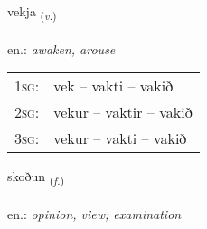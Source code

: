 \documentclass[frontgrid, backgrid]{flacards}\usepackage[]{graphicx}\usepackage[]{xcolor}
\begin{document}
\renewcommand{\blhead}{\vskip5pt {\small\bfseries\footnotesize Sagnorð | Verb }}
\renewcommand{\bcfoot}{\vskip5pt \hspace{2pt}{\small\bfseries\footnotesize 1K}}


{vekja \small{\textsubscript{(\textit{v.})}} \\[1ex] %
\textphonetic{[vɛːca]} \\
en.: \emph{awaken, arouse} \\  [2ex]
\renewcommand*{\arraystretch}{0.8}
\begin{tabular}{p{1cm}l}
\textsc{1sg}: & vek -- vakti -- vakið \\ 
\textsc{2sg}: & vekur -- vaktir -- vakið \\ 
\textsc{3sg}: & vekur -- vakti -- vakið \\ 
\end{tabular}
}

\renewcommand{\flhead}{\vskip5pt \fboxsep=0pt {\small\bfseries\footnotesize Nafnorð | Noun}}
\renewcommand{\fcfoot}{\vskip5pt \fboxsep=0pt \hspace{2pt}{\small\bfseries\footnotesize 1K}}

\renewcommand{\blhead}{\vskip5pt {\small\bfseries\footnotesize Nafnorð | Noun }}
\renewcommand{\bcfoot}{\vskip5pt \hspace{2pt}{\small\bfseries\footnotesize 1K}}


{skoðun \small{\textsubscript{(\textit{f.})}} \\[1ex] %
\textphonetic{[skɔːðʏn]} \\
en.: \emph{opinion, view; examination} \\  [2ex]
\renewcommand*{\arraystretch}{0.8}
}

\renewcommand{\flhead}{\vskip5pt \fboxsep=0pt {\small\bfseries\footnotesize Nafnorð | Noun}}
\renewcommand{\fcfoot}{\vskip5pt \fboxsep=0pt \hspace{2pt}{\small\bfseries\footnotesize 1K}}
\end{document}
